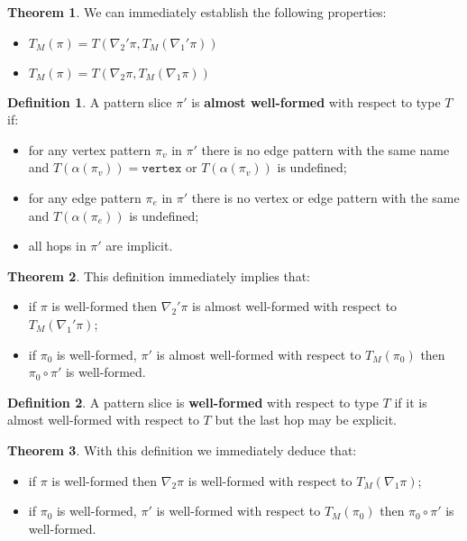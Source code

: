\documentclass[14pt]{constructor-thesis}
\theoremstyle{definition}
\newtheorem{theorem}{Theorem}
\newtheorem{definition}{Definition}
\begin{document}
\begin{theorem}
  We can immediately establish the following properties:
  \begin{itemize}
    \item $T_M(\pi) = T(\nabla_2' \pi, T_M(\nabla_1' \pi))$
    \item $T_M(\pi) = T(\nabla_2 \pi, T_M(\nabla_1 \pi))$
  \end{itemize}
\end{theorem}

\begin{definition}
  A pattern slice $\pi'$ is \textbf{almost well-formed} with respect to type $T$ if:
  \begin{itemize}
    \item for any vertex pattern $\pi_v$ in $\pi'$ there is no edge pattern with the same name and $T(\alpha(\pi_v)) = \texttt{vertex}$ or $T(\alpha(\pi_v))$ is undefined;
    \item for any edge pattern $\pi_e$ in $\pi'$ there is no vertex or edge pattern with the same and $T(\alpha(\pi_e))$ is undefined;
    \item all hops in $\pi'$ are implicit.
  \end{itemize}
\end{definition}

\begin{theorem}
  This definition immediately implies that:
  \begin{itemize}
    \item if $\pi$ is well-formed then $\nabla_2' \pi$ is almost well-formed with respect to $T_M(\nabla_1' \pi)$;
    \item if $\pi_0$ is well-formed, $\pi'$ is almost well-formed with respect to $T_M(\pi_0)$ then $\pi_0 \circ \pi'$ is well-formed.
  \end{itemize}
\end{theorem}

\begin{definition}
  A pattern slice is \textbf{well-formed} with respect to type $T$ if it is almost well-formed with respect to $T$ but the last hop may be explicit.
\end{definition}

\begin{theorem}
  With this definition we immediately deduce that:
  \begin{itemize}
    \item if $\pi$ is well-formed then $\nabla_2 \pi$ is well-formed with respect to $T_M(\nabla_1 \pi)$;
    \item if $\pi_0$ is well-formed, $\pi'$ is well-formed with respect to $T_M(\pi_0)$ then $\pi_0 \circ \pi'$ is well-formed.
  \end{itemize}
\end{theorem}
\end{document}
